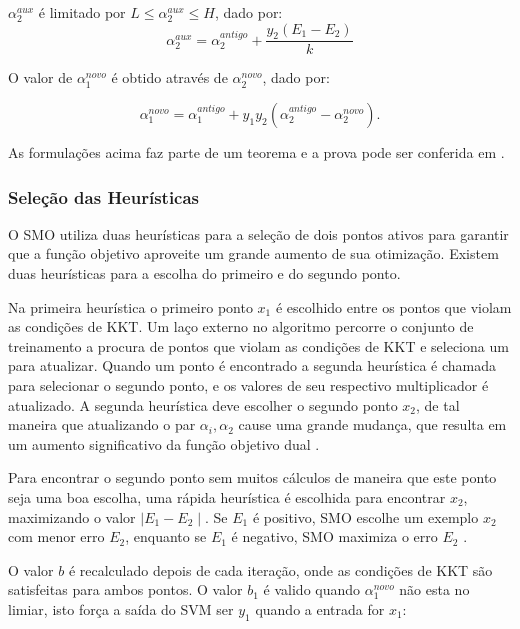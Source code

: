 $\alpha_{2}^{aux}$ é limitado por $L \leq \alpha_{2}^{aux} \leq H$, dado por:
\begin{equation}
\alpha_{2}^{aux} = \alpha_{2}^{antigo} + \frac{y_{2}(E_{1} - E_{2})}{k}
\end{equation}

O valor de $\alpha_{1}^{novo}$ é obtido através de $\alpha_{2}^{novo}$, dado por:

\begin{equation}
\alpha_{1}^{novo} = \alpha_{1}^{antigo} + y_{1}y_{2}(\alpha_{2}^{antigo} - \alpha_{2}^{novo}).
\end{equation}

As formulações acima faz parte de um teorema e a prova pode ser conferida em \cite{Cristianini2000}.

\subsubsection{Seleção das Heurísticas}

O SMO utiliza duas heurísticas para a seleção de dois pontos ativos para garantir que a função objetivo aproveite um grande aumento de sua otimização. Existem duas heurísticas para a escolha do primeiro e do segundo ponto.

Na primeira heurística o primeiro ponto $x_{1}$ é escolhido entre os pontos que violam as condições de KKT. Um laço externo no algoritmo percorre o conjunto de treinamento a procura de pontos que violam as condições de KKT e seleciona um para atualizar. Quando um ponto é encontrado a segunda heurística é chamada para selecionar o segundo ponto, e os valores de seu respectivo multiplicador é atualizado. A segunda heurística deve escolher o segundo ponto $x_{2}$, de tal maneira que atualizando o par $\alpha_{i},\alpha_{2}$ cause uma grande mudança, que resulta em um aumento significativo da função objetivo dual \cite{Cristianini2000}. 

Para encontrar o segundo ponto sem muitos cálculos  de maneira que este ponto seja uma boa escolha, uma rápida heurística é escolhida para encontrar $x_{2}$, maximizando o valor $\mid E_{1} - E_{2} \mid$. Se $E_{1}$ é positivo, SMO escolhe um exemplo $x_{2}$ com menor erro $E_{2}$, enquanto se $E_{1}$ é negativo, SMO maximiza o erro $E_{2}$ \cite{Cristianini2000}. 

O valor $b$ é recalculado depois de cada iteração, onde as condições de KKT são satisfeitas para ambos pontos. O valor $b_{1}$ é valido quando  $\alpha_{1}^{novo}$ não esta no limiar, isto força a saída do SVM ser $y_{1}$ quando a entrada for $x_{1}$:

